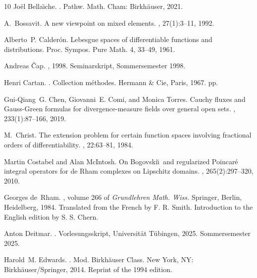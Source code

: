 \documentclass[10pt,a4paper]{amsart}
\theoremstyle{definition}
\theoremstyle{remark}
\numberwithin{equation}{section}
\begin{document}
\begin{thebibliography}{10}
Jo{\"e}l Bella{\"{\i}}che.
.
\newblock Pathw. Math. Cham: Birkh{\"a}user, 2021.

A.~Bossavit.
\newblock A new viewpoint on mixed elements.
, 27(1):3--11, 1992.

Alberto~P. Calder{\'o}n.
\newblock Lebesgue spaces of differentiable functions and distributions.
\newblock Proc. {Sympos}. {Pure} {Math}. 4, 33--49, 1961.

Andreas {\v{C}}ap.
, 1998.
\newblock Seminarskript, Sommersemester 1998.

Henri Cartan.
.
\newblock Collection m{\'e}thodes. Hermann \& Cie, Paris, 1967.
 pp.

Gui-Qiang~G. Chen, Giovanni~E. Comi, and Monica Torres.
\newblock Cauchy fluxes and {Gauss}-{Green} formulas for divergence-measure
  fields over general open sets.
, 233(1):87--166, 2019.

M.~Christ.
\newblock The extension problem for certain function spaces involving
  fractional orders of differentiability.
, 22:63--81, 1984.

Martin Costabel and Alan McIntosh.
\newblock On {B}ogovski\u\i\ and regularized {P}oincar\'e integral operators
  for de {R}ham complexes on {L}ipschitz domains.
, 265(2):297--320, 2010.

Georges de~Rham.
,
  volume 266 of {\em Grundlehren Math. Wiss.}
\newblock Springer, Berlin, Heidelberg, 1984.
\newblock Translated from the French by F. R. Smith. Introduction to the
  English edition by S. S. Chern.

Anton Deitmar.
.
\newblock Vorlesungsskript, Universit{\"a}t T{\"u}bingen, 2025.
\newblock Sommersemester 2025.

Harold~M. Edwards.
.
\newblock Mod. Birkh{\"a}user Class. New York, NY: Birkh{\"a}user/Springer,
  2014.
\newblock Reprint of the 1994 edition.


\end{thebibliography}
\end{document}

